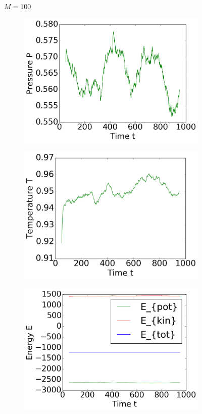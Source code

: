 \begin{figure}[ht]
$M=100$
\hfill
\begin{subfigure}{0.28\textwidth}
\includegraphics[width=\textwidth]{../dat/avPressure_M100.png}
\end{subfigure}
\hfill
\begin{subfigure}{0.28\textwidth}
\includegraphics[width=\textwidth]{../dat/avTemperature_M100.png}
\end{subfigure}
\hfill
\begin{subfigure}{0.28\textwidth}
\includegraphics[width=\textwidth]{../dat/avEnergies_M100.png}
\end{subfigure}
\end{figure}
